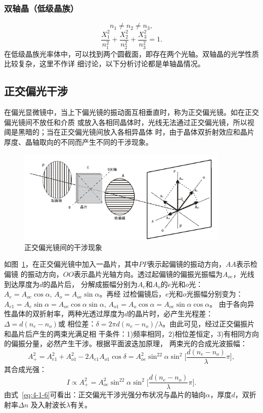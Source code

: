 \documentclass[11pt,a4paper]{article}
\begin{document}
\begin{spacing}{1.3}
\begin{CJK*}{UTF8}{gbsn}
\subsubsection{双轴晶（低级晶族）}
\begin{equation}
n_1\neq n_2\neq n_3,
\end{equation}
\begin{equation}
\frac{X_1^2}{n_1^2}+\frac{X_2^2}{n_2^2}+\frac{X_3^2}{n_3^2}=1.\label{4-1-4}
\end{equation} 
在低级晶族光率体中，可以找到两个圆截面，即存在两个光轴。双轴晶的光学性质比较复杂，这里不作详
细讨论，以下分析讨论都是单轴晶情况。

\subsection{正交偏光干涉}
在偏光显微镜中，当上下偏光镜的振动面互相垂直时，称为正交偏光镜。如在正交偏光镜间不放任和介质
或放入各相同晶体时，光线无法通过正交偏光镜，所以视阈是黑暗的；当在正交偏光镜间放入各相异晶体
时，由于晶体双折射效应和晶片厚度、晶轴取向的不同而产生不同的干涉现象。
\begin{figure}
\centering
\includegraphics[width=0.9\textwidth]{fig4-1-4}
\caption{正交偏光镜间的干涉现象}
\label{fig:4-1-4}
\end{figure}
如图~\ref{fig:4-1-4}，在正交偏光镜中加入一晶片，其中$PP$表示起偏镜的振动方向，$AA$表示检偏镜
的振动方向，$OO$表示晶片光轴方向。透过起偏镜的偏振光振幅为$A_{oe}$，光线到达厚度为$d$的晶片后，
分解成振幅分别为$A_e$和$A_o$的$e$光和$o$光：$A_e=A_{oe}\cos\alpha,\,A_o=A_{oe}\sin\alpha$。再经
过检偏镜后，$e$光和$o$光振幅分别变为：$A_{e1}=A_e\sin\alpha=A_{oe}\cos\alpha\sin\alpha,\,
A_{o1}=A_o\cos\alpha=A_{oe}\sin\alpha\cos\alpha$。
由于各向异性晶体的双折射率，两种光透过厚度为$d$的晶片时，必产生光程差：$\Delta=d(n_e-n_o)$或
相位差：$\delta=2\pi d(n_e-n_o)/\lambda$。由此可见，经过正交偏振片和晶片后产生的两束光满足相
干条件：1)频率相同，2)相位差恒定，3)有相同方向的偏振分量，必然产生干涉。根据平面波迭加原理，
两束光的合成光波振幅：
\begin{equation}
A_+^2=A_{e1}^2+A_{o1}^2-2A_{e1}A_{o1}\cos\delta=A_{oe}^2\sin^22\alpha\sin^2\big[\frac{d(n_e-n_o)}{\lambda}\pi\big],
\end{equation}
其合成光强：
\begin{equation}
I\propto A_+^2= A_{oe}^2\sin^22\alpha\sin^2\big[\frac{d(n_e-n_o)}{\lambda}\pi\big].\label{eq:4-1-6}
\end{equation}
由式~\eqref{eq:4-1-6}可看出：正交偏光干涉光强分布状况与晶片的轴向$\alpha$，厚度$d$，双折射率$\Delta n$
及入射波长$\lambda$有关。

\end{CJK*}
\end{spacing}
\end{document}
